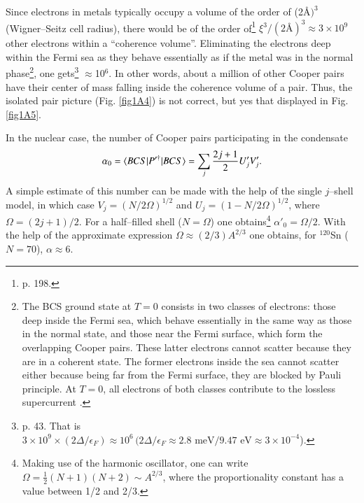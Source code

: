 \begin{subappendices}
Since electrons in metals typically occupy a volume of the order of (2\AA$)^3$ (Wigner--Seitz cell radius), there would be of the order of\footnote{\cite{Ketterson:99} p. 198.} $\xi^3/(2\text{\AA})^3\approx 3\times10^{9}$ other electrons within a ``coherence volume''. Eliminating the electrons deep within the Fermi sea as they behave essentially as if the metal was in the normal phase\footnote{The BCS ground state at $T=0$ consists in two classes of electrons: those deep inside the Fermi sea, which behave essentially in the same way as those in the normal state, and those near the Fermi surface, which form the overlapping Cooper pairs. These latter electrons cannot scatter because they are in a coherent state. The former electrons inside the sea cannot scatter either because being far from the Fermi surface, they are blocked by Pauli principle. At $T=0$, all electrons of both classes contribute to the lossless supercurrent \cite{Waldram:96}.}, one gets\footnote{\cite{Schrieffer:64} p. 43.  That is $3\times10^9\times(2\Delta/\epsilon_F)\approx10^6\,(2\Delta/\epsilon_F\approx 2.8 \text{ meV}/9.47\text{ eV}\approx 3\times 10^{-4}$).} $\approx$10$^6$. In other words, about a million of other Cooper pairs have their center of mass falling inside the coherence volume of a pair. Thus, the isolated pair picture (Fig. \ref{fig1A4}) is not correct, but yes that displayed in Fig. \ref{fig1A5}.





 


 In the nuclear case, the number of Cooper pairs participating in the condensate 
 \begin{align}\label{eq3B11}
\alpha_0=\langle {BCS|P'^\dagger|BCS} \rangle=\sum_j\frac{2j+1}{2}U'_jV'_j.
 \end{align}
 A simple estimate of this number can be made with the help of the single $j$--shell model, in which case $V_j=(N/2\Omega)^{1/2}$ and $U_j=(1-N/2\Omega)^{1/2}$, where $\Omega=(2j+1)/2$. For a half--filled shell ($N=\Omega$) one obtains\footnote{Making use of the harmonic oscillator, one can write $\Omega=\frac{1}{2}(N+1)(N+2)\sim A^{2/3}$, where the proportionality constant has a value between 1/2 and 2/3.} $\alpha'_0=\Omega/2$. With the help of the approximate expression $\Omega\approx(2/3)A^{2/3}$ one obtains, for $^{120}$Sn ($N=70$), $\alpha\approx6$.
 

\end{subappendices}
